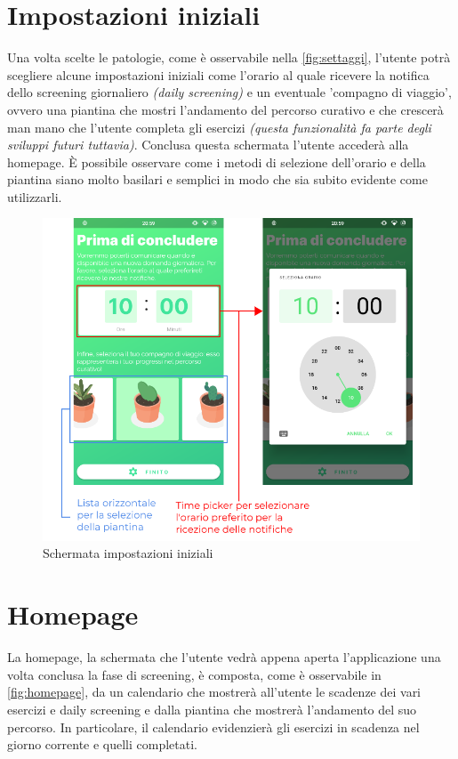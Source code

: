 \newpage
\section{Impostazioni iniziali}
\label{section:impostazioni}
Una volta scelte le patologie, come è osservabile nella \autoref{fig:settaggi}, l'utente potrà scegliere alcune impostazioni iniziali come l'orario al quale ricevere la notifica dello screening giornaliero \textit{(daily screening)} e un eventuale 'compagno di viaggio', ovvero una piantina che mostri l'andamento del percorso curativo e che crescerà man mano che l'utente completa gli esercizi \textit{(questa funzionalità fa parte degli sviluppi futuri tuttavia)}. Conclusa questa schermata l'utente accederà alla homepage. È possibile osservare come i metodi di selezione dell'orario e della piantina siano molto basilari e semplici in modo che sia subito evidente come utilizzarli.

\begin{figure}[h!]
\centering
\includegraphics[width=\textwidth]{img/settaggi}
\caption{Schermata impostazioni iniziali}
\label{fig:settaggi}
\end{figure}

\newpage
\section{Homepage}
La homepage, la schermata che l'utente vedrà appena aperta l'applicazione una volta conclusa la fase di screening, è composta, come è osservabile in \autoref{fig:homepage}, da un calendario che mostrerà all'utente le scadenze dei vari esercizi e daily screening e dalla piantina che mostrerà l'andamento del suo percorso. In particolare, il calendario evidenzierà gli esercizi in scadenza nel giorno corrente e quelli completati.

